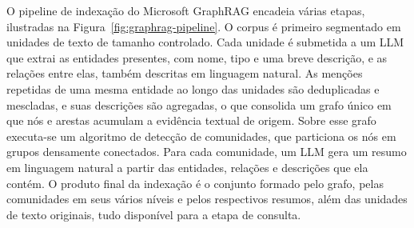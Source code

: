 O pipeline de indexação do Microsoft GraphRAG encadeia várias etapas, ilustradas na Figura~\ref{fig:graphrag-pipeline}. O corpus é primeiro segmentado em unidades de texto de tamanho controlado. Cada unidade é submetida a um LLM que extrai as entidades presentes, com nome, tipo e uma breve descrição, e as relações entre elas, também descritas em linguagem natural. As menções repetidas de uma mesma entidade ao longo das unidades são deduplicadas e mescladas, e suas descrições são agregadas, o que consolida um grafo único em que nós e arestas acumulam a evidência textual de origem. Sobre esse grafo executa-se um algoritmo de detecção de comunidades, que particiona os nós em grupos densamente conectados. Para cada comunidade, um LLM gera um resumo em linguagem natural a partir das entidades, relações e descrições que ela contém. O produto final da indexação é o conjunto formado pelo grafo, pelas comunidades em seus vários níveis e pelos respectivos resumos, além das unidades de texto originais, tudo disponível para a etapa de consulta.

